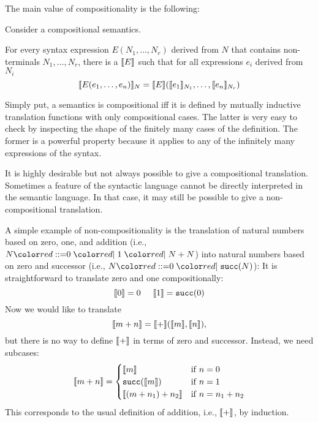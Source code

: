 The main value of compositionality is the following:
\begin{theorem}
Consider a compositional semantics.

For every syntax expression $E(N_1,\ldots,N_r)$ derived from $N$ that contains non-terminals $N_1,\ldots,N_r$,
there is a $\llbracket E\rrbracket$ such that for all expressions $e_i$ derived from $N_i$
\[\llbracket E(e_1,\ldots,e_n)\rrbracket_N=\llbracket E\rrbracket(\llbracket e_1\rrbracket_{N_1},\ldots,\llbracket e_n\rrbracket_{N_r})\]
\end{theorem}
Simply put, a semantics is compositional iff it is defined by mutually inductive translation functions with only compositional cases.
The latter is very easy to check by inspecting the shape of the finitely many cases of the definition.
The former is a powerful property because it applies to any of the infinitely many expressions of the syntax.

It is highly desirable but not always possible to give a compositional translation.
Sometimes a feature of the syntactic language cannot be directly interpreted in the semantic language.
In that case, it may still be possible to give a non-compositional translation.

\begin{example}
A simple example of non-compositionality is the translation of natural numbers based on zero, one, and addition (i.e., $N\bbc 0\bnfalt 1\bnfalt N+N$) into natural numbers based on zero and successor (i.e., $N\bbc 0\bnfalt\cn{succ}(N)$):
It is straightforward to translate zero and one compositionally:
\[\llbracket 0\rrbracket=0 \hspace*{.5cm}\llbracket 1\rrbracket=\mathtt{succ}(0)\]
Now we would like to translate \[\llbracket m+n\rrbracket=\llbracket +\rrbracket(\llbracket m\rrbracket,\llbracket n\rrbracket),\] but there is no way to define $\llbracket +\rrbracket$ in terms of zero and successor.
Instead, we need subcases:
\[\llbracket m+n\rrbracket=\begin{cases}\llbracket m\rrbracket&\mathrm{if}\; n=0 \\ \mathtt{succ}(\llbracket m\rrbracket)&\mathrm{if}\; n=1 \\ \llbracket (m+n_1)+n_2\rrbracket&\mathrm{if}\; n=n_1+n_2\end{cases}\]
This corresponds to the usual definition of addition, i.e., $\llbracket +\rrbracket$, by induction.
\end{example}


